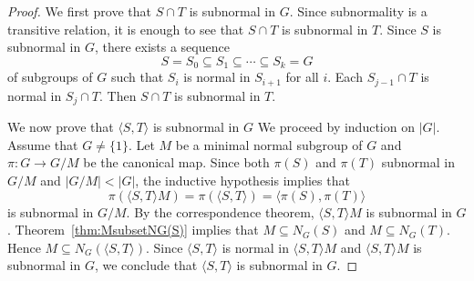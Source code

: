 \begin{proof}
	We first prove that $S\cap T$ is subnormal in $G$. Since subnormality is a transitive relation, it is enough to see that 
	$S\cap T$ is subnormal in $T$.
	Since $S$ is subnormal in $G$, there exists a sequence 
	\[
		S=S_0\subseteq S_1\subseteq \cdots\subseteq S_k=G
	\]
    of subgroups of $G$ such that $S_i$ is normal in $S_{i+1}$ for all $i$. 
	Each $S_{j-1}\cap T$ is normal in $S_j\cap T$. Then $S\cap T$ is 
	subnormal in $T$.
	
	
	We now prove that $\langle S,T\rangle$ is subnormal in $G$ 
	We proceed by induction on $|G|$. Assume that $G\ne\{1\}$. Let $M$ be a minimal normal subgroup of $G$ and 
    $\pi\colon G\to G/M$ be the canonical map. Since 
	both $\pi(S)$ and $\pi(T)$ subnormal in $G/M$ and $|G/M|<|G|$,
	the inductive hypothesis implies that 
	\[
	\pi(\langle S,T\rangle M)=\pi(\langle S,T\rangle)=\langle \pi(S),\pi(T)\rangle
	\]
	is subnormal in $G/M$. By the correspondence theorem, $\langle S,T\rangle M$ is 
	subnormal in $G$. Theorem~\ref{thm:MsubsetNG(S)}
	implies that $M\subseteq N_G(S)$ and $M\subseteq N_G(T)$. Hence $M\subseteq
	N_G(\langle S,T\rangle)$. Since $\langle S,T\rangle$ is normal in
	$\langle S,T\rangle M$ and $\langle S,T\rangle M$ is subnormal in $G$, we conclude that 
	$\langle S,T\rangle$ is subnormal in $G$.
\end{proof}


